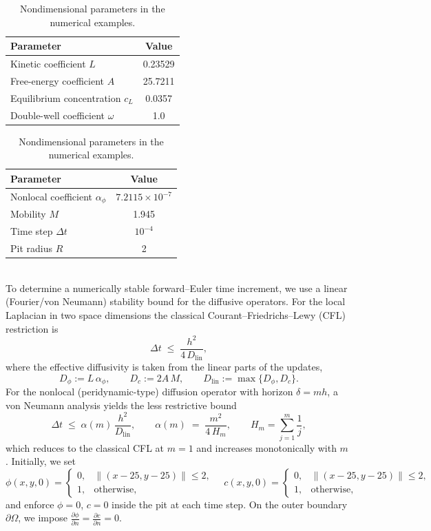 \documentclass[]{article}
\begin{document}
\begin{table}[ht]
	\centering
	\caption{Nondimensional parameters in the numerical examples.}
	\label{tab:params_updated}
	\begin{tabular}{l c}
		\hline
		Parameter & Value \\
		\hline
		Kinetic coefficient $L$             & 0.23529   \\
		Free-energy coefficient $A$        & 25.7211   \\
		Equilibrium concentration $c_{L}$   & 0.0357    \\
		Double-well coefficient $\omega$    & 1.0       \\
		\hline
	\end{tabular} \qquad
	\begin{tabular}{l c}
		\hline
		Parameter & Value \\
		\hline
		Nonlocal coefficient $\alpha_{\phi}$& $7.2115\times10^{-7}$ \\
		Mobility $M$                       & 1.945     \\
		Time step $\Delta t$    & $10^{-4}$ \\
		Pit radius $R$                     & 2         \\
		\hline
	\end{tabular}
\end{table}
\ \\
To determine a numerically stable forward–Euler time increment, we use a linear (Fourier/von Neumann) stability bound for the diffusive operators. For the local Laplacian in two space dimensions the classical Courant–Friedrichs–Lewy (CFL) restriction is
\begin{equation}
	\Delta t \;\le\; \frac{h^{2}}{4\,D_{\mathrm{lin}}},
\end{equation}
where the effective diffusivity is taken from the linear parts of the updates,
\[
D_\phi:=L\,\alpha_\phi,
\qquad
D_c:=2A\,M,
\qquad
D_{\mathrm{lin}}:=\max\{D_\phi,D_c\}.
\]
For the nonlocal (peridynamic-type) diffusion operator with horizon $\delta = m h$, a von Neumann analysis yields the less restrictive bound
\begin{equation}
	\Delta t \;\le\; \alpha(m)\,\frac{h^{2}}{D_{\mathrm{lin}}}, 
	\qquad
	\alpha(m)\;=\;\frac{m^{2}}{4\,H_{m}}, 
	\qquad
	H_{m}=\sum_{j=1}^{m}\frac{1}{j},
\end{equation}
which reduces to the classical CFL at $m=1$ and increases monotonically with $m$ \cite{mossaiby2025efficient}.
%
Initially, we set
\[
\phi(x,y,0)=
\begin{cases}
	0, & \|(x-25,y-25)\|\le2,\\
	1, & \text{otherwise},
\end{cases}
\quad
c(x,y,0)=
\begin{cases}
	0, & \|(x-25,y-25)\|\le2,\\
	1, & \text{otherwise},
\end{cases}
\]
and enforce $\phi=0$, $c=0$ inside the pit at each time step.  On the outer boundary $\partial\Omega$, we impose $\frac{\partial\phi}{\partial n}=\frac{\partial c}{\partial n}=0$. 
\end{document}
